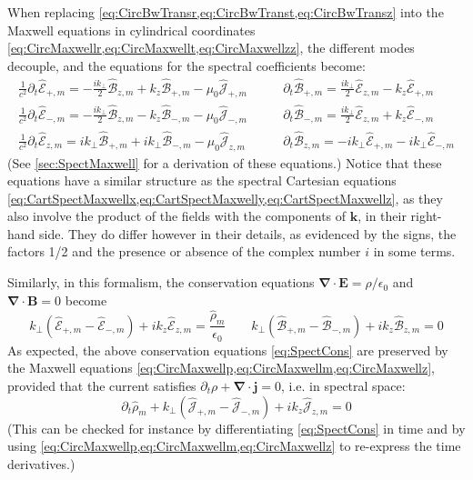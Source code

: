 \documentclass[1p,times]{elsarticle}
\renewcommand{\vec}[1]{\boldsymbol{#1}}
\newcommand{\spectral}[1]{\hat{\mathcal{#1}}}
\begin{document}
When replacing \cref{eq:CircBwTransr,eq:CircBwTranst,eq:CircBwTransz} into the Maxwell equations in cylindrical
coordinates \cref{eq:CircMaxwellr,eq:CircMaxwellt,eq:CircMaxwellzz},
the different modes decouple, and the equations for the spectral
coefficients become:
\begin{subequations}
\begin{align}
\frac{1}{c^2}\partial_t \spectral{E}_{+,m} = - \frac{ik_\perp }{2}\spectral{B}_{z,m} + k_z\spectral{B}_{+,m} - \mu_0\spectral{J}_{+,m} \qquad &   
\partial_t \spectral{B}_{+,m} = \frac{ik_\perp }{2} \spectral{E}_{z,m} - k_z
\spectral{E}_{+,m} 
\label{eq:CircMaxwellp} \\
\frac{1}{c^2}\partial_t \spectral{E}_{-,m} = -\frac{ik_\perp }{2} \spectral{B}_{z,m} - k_z \spectral{B}_{-,m} - \mu_0  \spectral{J}_{-,m} \qquad &   
\partial_t \spectral{B}_{-,m} = \frac{ik_\perp }{2} \spectral{E}_{z,m} + k_z
\spectral{E}_{-,m} \label{eq:CircMaxwellm} \\
\frac{1}{c^2}\partial_t \spectral{E}_{z,m} = ik_\perp  \spectral{B}_{+,m} + ik_\perp \spectral{B}_{-,m}  - \mu_0 \spectral{J}_{z,m}  \qquad & 
\partial_t \spectral{B}_{z,m} = -ik_\perp  \spectral{E}_{+,m} - ik_\perp \spectral{E}_{-,m}  \label{eq:CircMaxwellz} 
\end{align}
\end{subequations}
(See \ref{sec:SpectMaxwell} for a derivation of these equations.)
Notice that these equations have a similar structure as the spectral
Cartesian equations \cref{eq:CartSpectMaxwellx,eq:CartSpectMaxwelly,eq:CartSpectMaxwellz}, as 
they also involve the product of the fields with the components of
$\vec{k}$, in their right-hand side. They do differ however in their
details, as evidenced by the signs, the factors 1/2 and the
presence or absence of the complex number $i$ in some terms.

Similarly, in this formalism, the conservation equations
$\vec{\nabla}\cdot\vec{E}=\rho/\epsilon_0$ and
$\vec{\nabla}\cdot\vec{B} = 0$
become
\begin{equation}
\label{eq:SpectCons}
k_\perp (\spectral{E}_{+,m} -\spectral{E}_{-,m}) + ik_z \spectral{E}_{z,m} =
\frac{\spectral{\rho}_m}{\epsilon_0} \qquad
 k_\perp (\spectral{B}_{+,m} -\spectral{B}_{-,m}) + ik_z \spectral{B}_{z,m} =
0 \end{equation}
As expected, the above conservation equations \cref{eq:SpectCons} are
preserved by the Maxwell equations
\cref{eq:CircMaxwellp,eq:CircMaxwellm,eq:CircMaxwellz}, provided
that the current satisfies $\partial_t
\rho + \vec{\nabla} \cdot \vec{j} = 0$, i.e. in spectral space:
\begin{equation}
\label{eq:SpectCharge}
\partial_t \spectral{\rho}_m + k_\perp (\spectral{J}_{+,m} -\spectral{J}_{-,m}) + ik_z
\spectral{J}_{z,m} = 0
\end{equation} 
\noindent (This can be checked for instance by differentiating
\cref{eq:SpectCons} in time and by using
\cref{eq:CircMaxwellp,eq:CircMaxwellm,eq:CircMaxwellz} to re-express the
time derivatives.)
\end{document}

